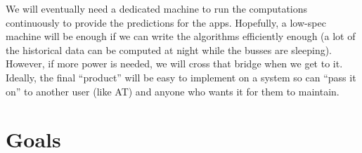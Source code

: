 \documentclass[12pt,a4paper]{article}
\begin{document}
We will eventually need a dedicated machine to run the computations continuously to provide the predictions
for the apps.
Hopefully, a low-spec machine will be enough if we can write the algorithms efficiently enough 
(a lot of the historical data can be computed at night while the busses are sleeping).
However, if more power is needed, we will cross that bridge when we get to it.
Ideally, the final ``product'' will be easy to implement on a system so can ``pass it on''
to another user (like AT) and anyone who wants it for them to maintain.





\section{Goals}













\end{document}
